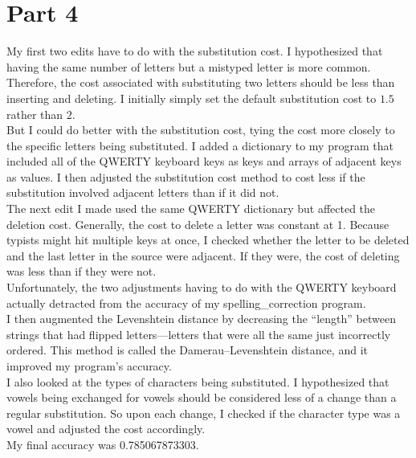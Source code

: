 \documentclass[a4paper,10pt]{article}
\newcommand{\br}{\\[10pt]}
\begin{document}
  \section*{Part 4}
  My first two edits have to do with the substitution cost. I hypothesized that having the same number of letters but a mistyped letter is more common. Therefore, the cost associated with substituting two letters should be less than inserting and deleting. I initially simply set the default substitution cost to $1.5$ rather than $2$.
  \br
  But I could do better with the substitution cost, tying the cost more closely to the specific letters being substituted. I added a dictionary to my program that included all of the QWERTY keyboard keys as keys and arrays of adjacent keys as values. I then adjusted the substitution cost method to cost less if the substitution involved adjacent letters than if it did not. 
  \br
  The next edit I made used the same QWERTY dictionary but affected the deletion cost. Generally, the cost to delete a letter was constant at 1. Because typists might hit multiple keys at once, I checked whether the letter to be deleted and the last letter in the source were adjacent. If they were, the cost of deleting was less than if they were not.
  \br
  Unfortunately, the two adjustments having to do with the QWERTY keyboard actually detracted from the accuracy of my spelling\_correction program.
  \br
  I then augmented the Levenshtein distance by decreasing the ``length'' between strings that had flipped letters---letters that were all the same just incorrectly ordered. This method is called the Damerau–Levenshtein distance, and it improved my program's accuracy.
  \br
  I also looked at the types of characters being substituted. I hypothesized that vowels being exchanged for vowels should be considered less of a change than a regular substitution. So upon each change, I checked if the character type was a vowel and adjusted the cost accordingly.
  \br
  My final accuracy was 0.785067873303.
\end{document}
